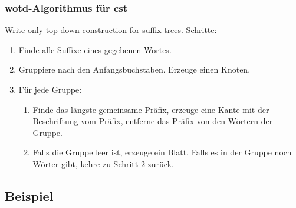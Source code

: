 \documentclass{beamer}
\begin{document}
\begin{frame}[t]
\frametitle{wotd-Algorithmus für cst}
    Write-only top-down construction for suffix trees.
    \medskip
    Schritte:
    \begin{enumerate}
    \item Finde alle Suffixe eines gegebenen Wortes.
    \item Gruppiere nach den Anfangsbuchstaben. Erzeuge einen Knoten.
    \item Für jede Gruppe:
    \begin{enumerate}
    \item Finde das längste gemeinsame Präfix, erzeuge eine Kante mit der Beschriftung vom Präfix, entferne das Präfix von den Wörtern der Gruppe.
    \item Falls die Gruppe leer ist, erzeuge ein Blatt. Falls es in der Gruppe noch Wörter gibt, kehre zu Schritt 2 zurück.
    \end{enumerate}
    \end{enumerate}
\end{frame}


\subsection{Beispiel}

\end{document}
